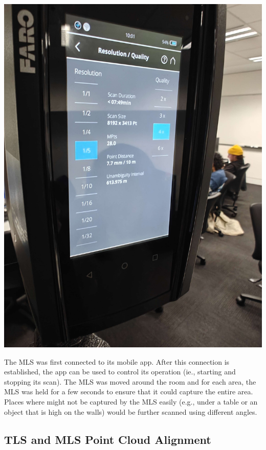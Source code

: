 \documentclass[man]{apa7}
\begin{document}
\begin{minipage}{\linewidth}
  \includegraphics[height=\textheight/3 ,width=\textwidth/3]{figures/IMG20240418194000.jpg}
  \label{fig:TLSSettings}
\end{minipage}

The MLS was first connected to its mobile app. After this connection is established, the app can be used to control its operation (ie., starting and stopping its scan). The MLS was moved around the room and for each area, the MLS was held for a few seconds to ensure that it could capture the entire area. Places where might not be captured by the MLS easily (e.g., under a table or an object that is high on the walls) would be further scanned using different angles.


\subsection{TLS and MLS Point Cloud Alignment}
\end{document}

